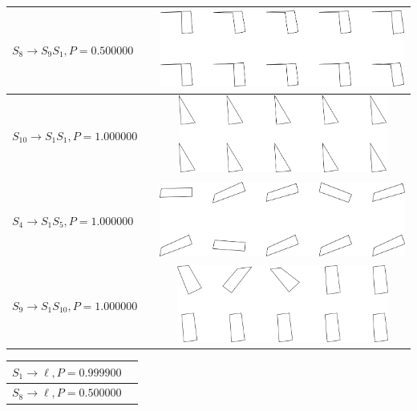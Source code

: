 \begin{tabular}{|l|c|c|}

\hline
$S_{8} \to S_{9} S_{1}, P=0.500000$ &  & \includegraphics[height=1in]{output/1.models/hand_built/hand/gram.0006.sample.png} \\
\hline
$S_{10} \to S_{1} S_{1}, P=1.000000$ &  & \includegraphics[height=1in]{output/1.models/hand_built/hand/gram.0007.sample.png} \\
\hline
$S_{4} \to S_{1} S_{5}, P=1.000000$ &  & \includegraphics[height=1in]{output/1.models/hand_built/hand/gram.0008.sample.png} \\
\hline
$S_{9} \to S_{1} S_{10}, P=1.000000$ &  & \includegraphics[height=1in]{output/1.models/hand_built/hand/gram.0009.sample.png} \\
\hline
\end{tabular}
\begin{tabular}{|l|c|}

\hline
$S_{1} \to \ell, P=0.999900$ & \\
\hline
$S_{8} \to \ell, P=0.500000$ & \\
\hline
\end{tabular}
